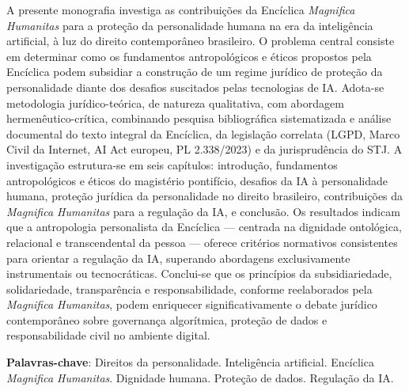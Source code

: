\documentclass[
    12pt,
    openany,
    oneside,
    a4paper,
    brazilian
]{abntex2}
\newcommand{\MH}{\textit{Magnifica Humanitas}}
\begin{document}
\begin{resumo}
    A presente monografia investiga as contribuições da Encíclica \MH{} para a proteção da personalidade humana na era da inteligência artificial, à luz do direito contemporâneo brasileiro. O problema central consiste em determinar como os fundamentos antropológicos e éticos propostos pela Encíclica podem subsidiar a construção de um regime jurídico de proteção da personalidade diante dos desafios suscitados pelas tecnologias de IA. Adota-se metodologia jurídico-teórica, de natureza qualitativa, com abordagem hermenêutico-crítica, combinando pesquisa bibliográfica sistematizada e análise documental do texto integral da Encíclica, da legislação correlata (LGPD, Marco Civil da Internet, AI Act europeu, PL 2.338/2023) e da jurisprudência do STJ. A investigação estrutura-se em seis capítulos: introdução, fundamentos antropológicos e éticos do magistério pontifício, desafios da IA à personalidade humana, proteção jurídica da personalidade no direito brasileiro, contribuições da \MH{} para a regulação da IA, e conclusão. Os resultados indicam que a antropologia personalista da Encíclica --- centrada na dignidade ontológica, relacional e transcendental da pessoa --- oferece critérios normativos consistentes para orientar a regulação da IA, superando abordagens exclusivamente instrumentais ou tecnocráticas. Conclui-se que os princípios da subsidiariedade, solidariedade, transparência e responsabilidade, conforme reelaborados pela \MH{}, podem enriquecer significativamente o debate jurídico contemporâneo sobre governança algorítmica, proteção de dados e responsabilidade civil no ambiente digital.

    \vspace{0.3cm}
    \noindent
    \textbf{Palavras-chave}: Direitos da personalidade. Inteligência artificial. Encíclica \MH. Dignidade humana. Proteção de dados. Regulação da IA.
\end{resumo}
\end{document}
